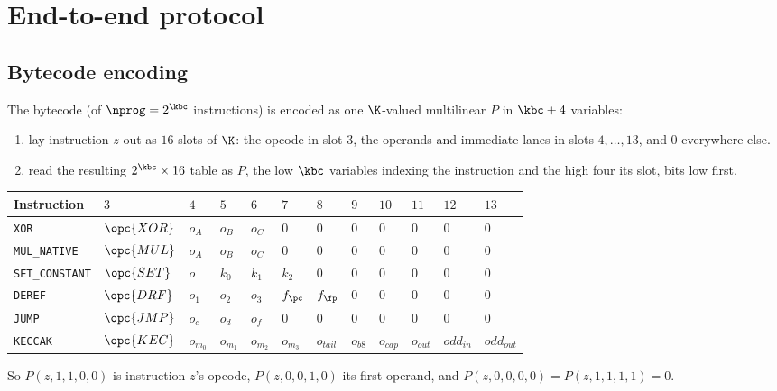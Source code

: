 \section{End-to-end protocol}\label{sec:e2e}

\subsection{Bytecode encoding}\label{sec:e2e-bc}

The bytecode (of $\nprog=2^{\kbc}$ instructions) is encoded as one $\K$-valued multilinear $P$ in $\kbc+4$ variables:
\begin{enumerate}[itemsep=1pt,topsep=3pt]
\item lay instruction $z$ out as $16$ slots of $\K$: the opcode in slot $3$, the operands and immediate lanes in slots $4,\dots,13$, and $0$ everywhere else.
\item read the resulting $2^{\kbc}\times16$ table as $P$, the low $\kbc$ variables indexing the instruction and the high four its slot, bits low first.
\end{enumerate}
\begin{center}
\begin{tabular}{llllllllllll}
\hline
Instruction & $3$ & $4$ & $5$ & $6$ & $7$ & $8$ & $9$ & $10$ & $11$ & $12$ & $13$\\
\hline
\texttt{XOR}           & $\opc{XOR}$ & $o_A$ & $o_B$ & $o_C$ & $0$ & $0$ & $0$ & $0$ & $0$ & $0$ & $0$\\
\texttt{MUL\_NATIVE}   & $\opc{MUL}$ & $o_A$ & $o_B$ & $o_C$ & $0$ & $0$ & $0$ & $0$ & $0$ & $0$ & $0$\\
\texttt{SET\_CONSTANT} & $\opc{SET}$ & $o$   & $k_0$ & $k_1$ & $k_2$ & $0$ & $0$ & $0$ & $0$ & $0$ & $0$\\
\texttt{DEREF}         & $\opc{DRF}$ & $o_1$ & $o_2$ & $o_3$ & $f_{\pc}$ & $f_{\fp}$ & $0$ & $0$ & $0$ & $0$ & $0$\\
\texttt{JUMP}          & $\opc{JMP}$ & $o_c$ & $o_d$ & $o_f$ & $0$ & $0$ & $0$ & $0$ & $0$ & $0$ & $0$\\
\texttt{KECCAK}        & $\opc{KEC}$ & $o_{m_0}$ & $o_{m_1}$ & $o_{m_2}$ & $o_{m_3}$ & $o_{\mathit{tail}}$ & $o_{\mathit{b8}}$ & $o_{\mathit{cap}}$ & $o_{\mathit{out}}$ & $\mathit{odd}_{\mathit{in}}$ & $\mathit{odd}_{\mathit{out}}$\\
\hline
\end{tabular}
\end{center}
So $P(z,1,1,0,0)$ is instruction $z$'s opcode, $P(z,0,0,1,0)$ its first operand, and $P(z,0,0,0,0)=P(z,1,1,1,1)=0$.

